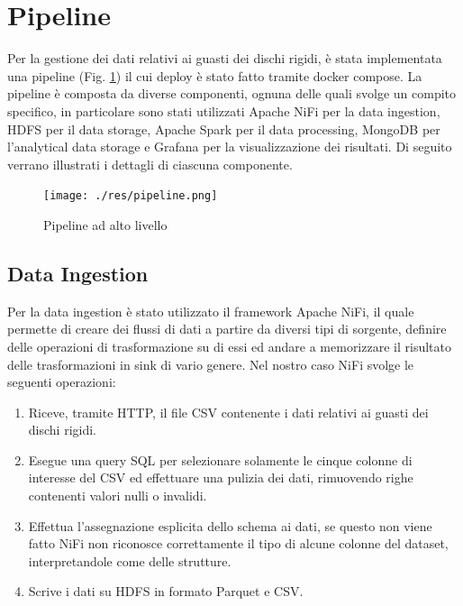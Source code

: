 \documentclass[conference]{IEEEtran}
\begin{document}
\section{Pipeline}
Per la gestione dei dati relativi ai guasti dei dischi rigidi, è stata implementata una pipeline (Fig. \ref{fig:pipeline}) il cui deploy è stato fatto tramite docker compose. La pipeline è composta da diverse componenti, ognuna delle quali svolge un compito specifico, in particolare sono stati utilizzati Apache NiFi per la data ingestion, HDFS per il data storage, Apache Spark per il data processing, MongoDB per l'analytical data storage e Grafana per la visualizzazione dei risultati. Di seguito verrano illustrati i dettagli di ciascuna componente.
\begin{figure}[H]
    \centering
    \texttt{[image: ./res/pipeline.png]}
    \caption{Pipeline ad alto livello}
    \label{fig:pipeline}
\end{figure} 
\subsection{Data Ingestion}
Per la data ingestion è stato utilizzato il framework Apache NiFi, il quale permette di creare dei flussi di dati a partire da diversi tipi di sorgente, definire delle operazioni di trasformazione su di essi ed andare a memorizzare il risultato delle trasformazioni in sink di vario genere. Nel nostro caso NiFi svolge le seguenti operazioni:
\begin{enumerate}
    \item Riceve, tramite HTTP, il file CSV contenente i dati relativi ai guasti dei dischi rigidi.
    \item Esegue una query SQL %
    per selezionare solamente le cinque colonne di interesse del CSV ed effettuare una pulizia dei dati, rimuovendo righe contenenti valori nulli o invalidi. 
    \item Effettua l'assegnazione esplicita dello schema ai dati, se questo non viene fatto NiFi non riconosce correttamente il tipo di alcune colonne del dataset, interpretandole come delle strutture.
    \item Scrive i dati su HDFS in formato Parquet e CSV.
\end{enumerate}
\end{document}
